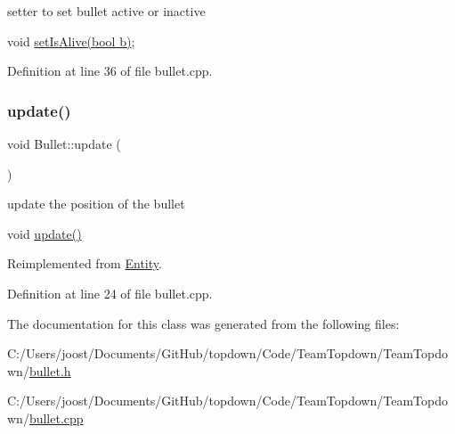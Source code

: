 setter to set bullet active or inactive 

void \hyperlink{class_bullet_a2f178ec7de59d5ff1edd975065b4f279}{set\+Is\+Alive(bool b)}; 

Definition at line 36 of file bullet.\+cpp.

\mbox{\label{class_bullet_a32f4a0611fe2dd245fee955d14ca1f68}} 
\subsubsection{\texorpdfstring{update()}{update()}}
{\footnotesize\ttfamily void Bullet\+::update (\begin{DoxyParamCaption}{ }\end{DoxyParamCaption})\hspace{0.3cm}{\ttfamily [virtual]}}



update the position of the bullet 

void \hyperlink{class_bullet_a32f4a0611fe2dd245fee955d14ca1f68}{update()} 

Reimplemented from \hyperlink{class_entity_aed73e98b980b85833428c935cc1c69f8}{Entity}.



Definition at line 24 of file bullet.\+cpp.



The documentation for this class was generated from the following files\+:\begin{DoxyCompactItemize}
\item 
C\+:/\+Users/joost/\+Documents/\+Git\+Hub/topdown/\+Code/\+Team\+Topdown/\+Team\+Topdown/\hyperlink{bullet_8h}{bullet.\+h}\item 
C\+:/\+Users/joost/\+Documents/\+Git\+Hub/topdown/\+Code/\+Team\+Topdown/\+Team\+Topdown/\hyperlink{bullet_8cpp}{bullet.\+cpp}\end{DoxyCompactItemize}
